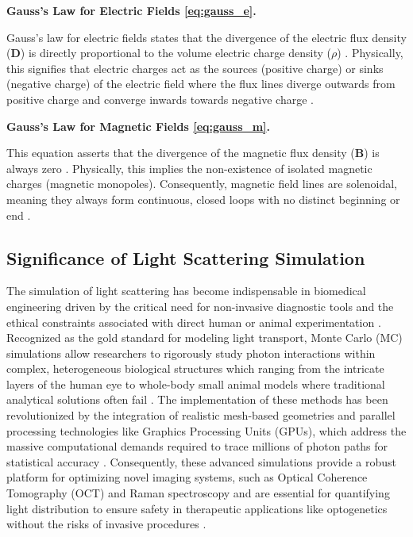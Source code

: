 \documentclass[class=report, crop=false]{standalone}
\begin{document}
\vspace{12pt}

\noindent\textbf{Gauss's Law for Electric Fields \eqref{eq:gauss_e}.}

\noindent Gauss's law for electric fields states that the divergence of the electric flux density ($\bm{D}$) is directly proportional to the volume electric charge density ($\rho$) \citep{Jin2015}. Physically, this signifies that electric charges act as the sources (positive charge) or sinks (negative charge) of the electric field where the flux lines diverge outwards from positive charge and converge inwards towards negative charge \citep{Jin2015}.

\vspace{12pt}

\noindent\textbf{Gauss's Law for Magnetic Fields \eqref{eq:gauss_m}.}

\noindent This equation asserts that the divergence of the magnetic flux density ($\bm{B}$) is always zero \citep{Jin2015}. Physically, this implies the non-existence of isolated magnetic charges (magnetic monopoles). Consequently, magnetic field lines are solenoidal, meaning they always form continuous, closed loops with no distinct beginning or end \citep{Jin2015}.

\subsection{Significance of Light Scattering Simulation}

The simulation of light scattering has become indispensable in biomedical engineering driven by the critical need for non-invasive diagnostic tools and the ethical constraints associated with direct human or animal experimentation \citep{Periyasamy2017, Krasnikov2019}. Recognized as the gold standard for modeling light transport, Monte Carlo (MC) simulations allow researchers to rigorously study photon interactions within complex, heterogeneous biological structures which ranging from the intricate layers of the human eye to whole-body small animal models where traditional analytical solutions often fail \citep{Periyasamy2017, Krasnikov2019}. The implementation of these methods has been revolutionized by the integration of realistic mesh-based geometries and parallel processing technologies like Graphics Processing Units (GPUs), which address the massive computational demands required to trace millions of photon paths for statistical accuracy \citep{Periyasamy2017, Krasnikov2019}. Consequently, these advanced simulations provide a robust platform for optimizing novel imaging systems, such as Optical Coherence Tomography (OCT) and Raman spectroscopy and are essential for quantifying light distribution to ensure safety in therapeutic applications like optogenetics without the risks of invasive procedures \citep{Krasnikov2019}.
\end{document}
